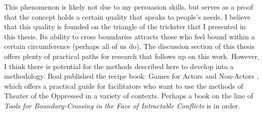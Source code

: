 \documentclass[dissertation,math,vertlayout,pdfa,colorlinks,nologo]{aaltoseries}
\begin{document}
This phenomenon is likely not due to my persuasion skills, but serves as a proof that the concept holds a certain quality that speaks to people's needs. I believe that this quality is founded on the triangle of the trickster that I presented in this thesis. Its ability to cross boundaries attracts those who feel bound within a certain circumference (perhaps all of us do). The discussion section of this thesis offers plenty of practical paths for research that follows up on this work. However, I think there is potential for the methods described here to develop into a methodology. Boal published the recipe book: Games for Actors and Non-Actors \cite{boalGamesActorsNonActors2021}, which offers a practical guide for facilitators who want to use the methods of Theater of the Oppressed in a variety of contexts. Perhaps a book on the line of \textit{Tools for Boundary-Crossing in the Face of Intractable Conflicts} is in order.

\renewcommand{\bibname}{References}
\LARGE  %




\end{document}
